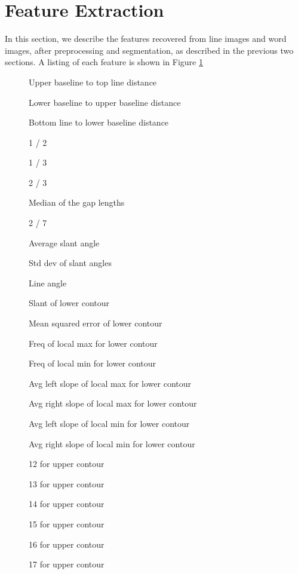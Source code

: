 \documentclass[paper=a4, fontsize=11pt]{scrartcl} %
\numberwithin{equation}{section} %
\numberwithin{figure}{section} %
\numberwithin{table}{section} %
\begin{document}
\section{Feature Extraction}
\label{sec:feature}
In this section, we describe the features recovered from line images
and word images, after preprocessing and segmentation, as described in
the previous two sections. A listing of each feature is shown in
Figure \ref{fig:featureList}

\begin{figure}
  \label{fig:featureList}
  \begin{multicols}{3}
    \begin{enumerate*}
    \item Upper baseline to top line distance
    \item Lower baseline to upper baseline distance
    \item Bottom line to lower baseline distance
    \item 1 / 2
    \item 1 / 3
    \item 2 / 3
    \item Median of the gap lengths
    \item 2 / 7
    \item Average slant angle
    \item Std dev of slant angles
    \item Line angle
    \item Slant of lower contour
    \item Mean squared error of lower contour
    \item Freq of local max for lower contour
    \item Freq of local min for lower contour
    \item Avg left slope of local max for lower contour
    \item Avg right slope of local max for lower contour
    \item Avg left slope of local min for lower contour
    \item Avg right slope of local min for lower contour
    \item 12 for upper contour
    \item 13 for upper contour
    \item 14 for upper contour
    \item 15 for upper contour
    \item 16 for upper contour
    \item 17 for upper contour

\end{enumerate*}
\end{multicols}
\end{figure}
\end{document}
